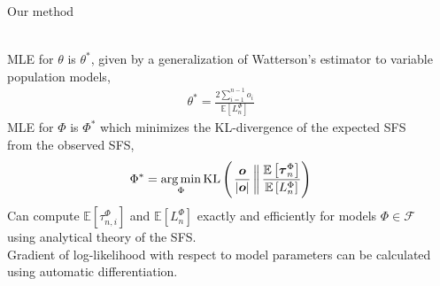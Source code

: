 \documentclass[final,hyperref={pdfpagelabels=false},professionalfonts,mathserif]{beamer}
\DeclareMathOperator*{\argmin}{arg\,min}
\def\bbE{\mathbb{E}}
\def\bfmath#1{\mathchoice
        {\mbox{\boldmath$#1$}}%
        {\mbox{\boldmath$#1$}}%
        {\mbox{\boldmath$\scriptstyle#1$}}%
        {\mbox{\boldmath$\scriptscriptstyle#1$}}}%
\def\bfo{\bfmath{o}}
\def\cF{\mathcal{F}}
\begin{document}
\begin{frame}[fragile]
\begin{columns}[t]
\begin{column}{.495\linewidth}
\begin{block}{\large Our method}
\begin{columns}[T]
\begin{column}{.97\linewidth}
\begin{align*}
				\end{align*}
				MLE for $\theta$ is $\theta^*$, given by a generalization of Watterson's estimator to variable population models,
				\begin{align*}
					\theta^* = \frac{2 \sum_{i=1}^{n-1} o_i}{\bbE\left[L^{\Phi}_{n}\right]}
				\end{align*}
				MLE for $\Phi$ is $\Phi^*$ which minimizes the KL-divergence of the expected SFS from the observed SFS,
				\begin{align*}
					\Phi^* = \argmin_{\Phi} \textrm{KL}\left( \left. \frac{\bfo}{\lvert \bfo \rvert} \, \right\| \frac{\bbE\left[\bfmath{\tau}^{\Phi}_n\right]}{\bbE\left[L^{\Phi}_n\right]} \right)
				\end{align*}
				Can compute $\bbE\left[\tau^{\Phi}_{n,i}\right]$ and $\bbE\left[L^{\Phi}_n\right]$ exactly and efficiently for models $\Phi \in \cF$ using analytical theory of the SFS. \\
				Gradient of log-likelihood with respect to model parameters can be calculated using automatic differentiation.
		    \end{column} 
	        \end{columns} 
        \end{block}
        
	\end{column}


	\begin{column}{.495\linewidth}
		

\end{column}
\end{columns}
\end{frame}
\end{document}
